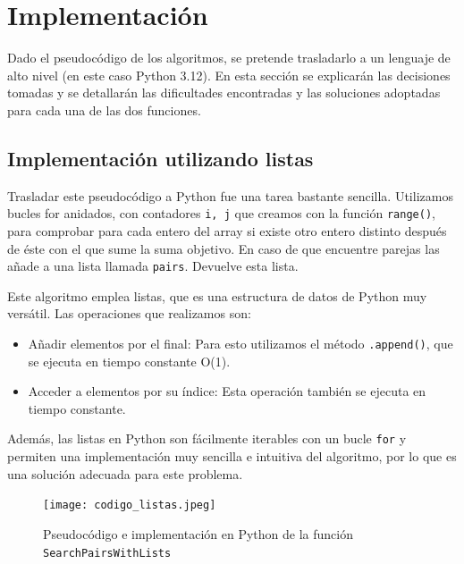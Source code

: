 \documentclass[a4paper, titlepage]{article}
\begin{document}
\section{Implementación}

Dado el pseudocódigo de los algoritmos, se pretende trasladarlo a un lenguaje de alto nivel (en este caso Python 3.12). En esta sección se explicarán las decisiones tomadas y se detallarán las dificultades encontradas y las soluciones adoptadas para cada una de las dos funciones.

\subsection{Implementación utilizando listas}

Trasladar este pseudocódigo a Python fue una tarea bastante sencilla. Utilizamos bucles for anidados, con contadores \texttt{i, j} que creamos con la función \texttt{range()}, para comprobar para cada entero del array si existe otro entero distinto después de éste con el que sume la suma objetivo. En caso de que encuentre parejas las añade a una lista llamada  \texttt{pairs}. Devuelve esta lista.

Este algoritmo emplea listas, que es una estructura de datos de Python muy versátil. Las operaciones que realizamos son:

\begin{itemize}

\item{Añadir elementos por el final: Para esto utilizamos el método \texttt{.append()}, que se ejecuta en tiempo constante O(1).}
\item{Acceder a elementos por su índice: Esta operación también se ejecuta en tiempo constante.}

\end{itemize}

Además, las listas en Python son fácilmente iterables con un bucle \texttt{for} y permiten una implementación muy sencilla e intuitiva del algoritmo, por lo que es una solución adecuada para este problema.

\begin{figure}[h]


\texttt{[image: codigo\_listas.jpeg]}

\caption{Pseudocódigo e implementación en Python de la función \texttt{SearchPairsWithLists}}
\label{codigolistas}



\end{figure}
\end{document}
